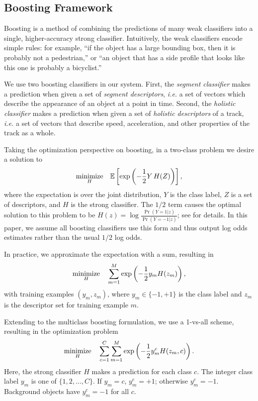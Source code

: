 \documentclass[letterpaper, 10 pt, conference]{ieeeconf}  %
\begin{document}
\subsection{Boosting Framework}
\label{sec:boosting}

Boosting is a method of combining the predictions of many weak classifiers into a single, higher-accuracy strong classifier.  Intuitively, the weak classifiers encode simple rules: for example, ``if the object has a large bounding box, then it is probably not a pedestrian,'' or ``an object that has a side profile that looks like this one is probably a bicyclist.''

We use two boosting classifiers in our system.  First, the \textit{segment classifier} makes a prediction when given a set of \textit{segment descriptors}, \textit{i.e.} a set of vectors which describe the appearance of an object at a point in time.  Second, the \textit{holistic classifier} makes a prediction when given a set of \textit{holistic descriptors} of a track, \textit{i.e.} a set of vectors that describe speed, acceleration, and other properties of the track as a whole.

Taking the optimization perspective on boosting, in a two-class problem we desire a solution to
\begin{align}
  \underset{H}{\mbox{minimize}}\quad \mathbb{E} \left[ \exp \left( -\frac{1}{2}Y \, H(Z) \right) \right] \label{eqn:expectation_optimization},
\end{align}
where the expectation is over the joint distribution, $Y$ is the class label, $Z$ is a set of descriptors, and $H$ is the strong classifier.  The $1/2$ term causes the optimal solution to this problem to be $H(z) = \log \frac{\Pr(Y = 1 | z)}{\Pr(Y = -1 | z)}$; see \cite{Friedman2000} for details.  In this paper, we assume all boosting classifiers use this form and thus output log odds estimates rather than the usual $1 / 2$ log odds.

In practice, we approximate the expectation with a sum, resulting in
\begin{align*}
  \underset{H}{\mbox{minimize}}\quad \sum_{m=1}^M \exp \left(-\frac{1}{2}y_m H(z_m) \right),
\end{align*}
with training examples $(y_m, z_m)$, where $y_m \in \{-1, +1\}$ is the class label and $z_m$ is the descriptor set for training example $m$.

Extending to the multiclass boosting formulation, we use a 1-vs-all scheme, resulting in the optimization problem
\begin{align*}
  \underset{H}{\mbox{minimize}}\quad \sum_{c=1}^C \sum_{m=1}^M \exp \left(-\frac{1}{2}y_m^c H(z_m, c) \right).
\end{align*}
Here, the strong classifier $H$ makes a prediction for each class $c$.  The integer class label $y_m$ is one of $\{1, 2, \dots, C \}$.  If $y_m = c$, $y_m^c = +1$; otherwise $y_m^c = -1$.  Background objects have $y_m^c = -1$ for all $c$.
\end{document}
